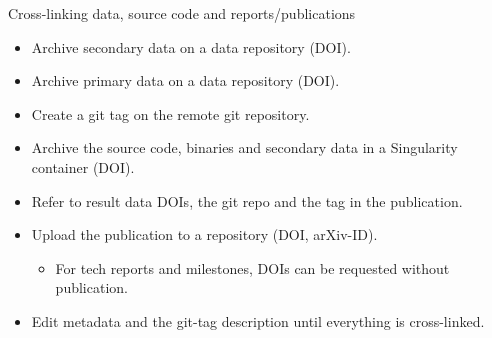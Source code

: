 \documentclass[
	ngerman,%
	aspectratio=169,%
	color={accentcolor=2d},
	logo=true,%
	colorframetitle=true,%
	]{tudabeamer}
\begin{document}
\begin{frame}{Cross-linking data, source code and reports/publications} 
	
	\vfill
	\begin{itemize}
		\item Archive secondary data on a data repository (DOI). 
		\item Archive primary data on a data repository (DOI). 
		\item Create a git tag on the remote git repository. 
		\item Archive the source code, binaries and secondary data in a Singularity container (DOI). 
		\item Refer to result data DOIs, the git repo and the tag in the publication.
		\item Upload the publication to a repository (DOI, arXiv-ID).
			\begin{itemize}
				\item For tech reports and milestones, DOIs can be requested without publication.
			\end{itemize}
		\item Edit metadata and the git-tag description until everything is cross-linked.
	\end{itemize}

\end{frame}
\end{document}
